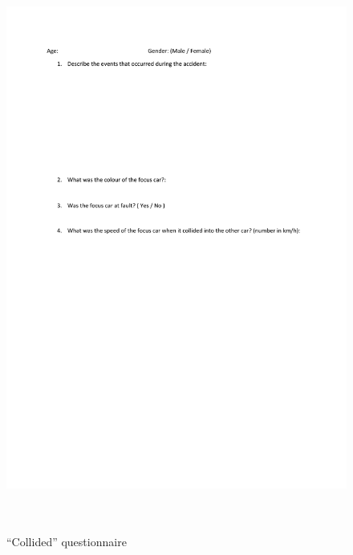 \documentclass[11pt]{article}
\begin{document}
\begin{figure}[H]
  \caption{ ~\\``Collided'' questionnaire} 
  \centering 
  \includegraphics[width=\textwidth]{collided.pdf}
~\label{ques:collided}
\end{figure} 
\end{document}
